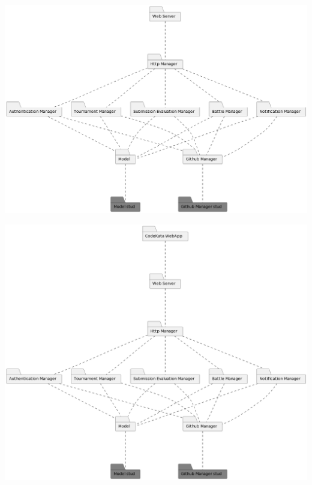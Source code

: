 \documentclass{article}
\begin{document}
\begin{center}
    \includegraphics[width=\linewidth]{its4.png}
  \label{fig:its4}
\end{center}

\begin{center}
    \includegraphics[width=\linewidth]{its5.png}
  \label{fig:its5}
\end{center}
\end{document}
